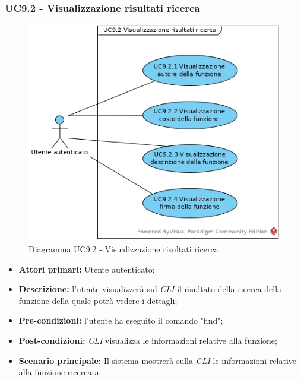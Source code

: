 \subsubsection{UC9.2 - Visualizzazione risultati ricerca}
\begin{figure}[h]
	\centering
	\includegraphics[width=0.7\linewidth]{res/img/UC9.2.jpg}
	\caption{Diagramma UC9.2 - Visualizzazione risultati ricerca}
\end{figure}
\begin{itemize}
	\item \textbf{Attori primari:} Utente autenticato;
	\item \textbf{Descrizione:} l'utente visualizzerà sul \textit{CLI\glo} il risultato della ricerca della funzione della quale potrà vedere i dettagli;
	\item \textbf{Pre-condizioni:} l'utente ha eseguito il comando "find";
	\item \textbf{Post-condizioni:} \textit{CLI\glo} visualizza le informazioni relative alla funzione;
	\item \textbf{Scenario principale:} Il sistema mostrerà sulla \textit{CLI\glo} le informazioni relative alla funzione ricercata.
\end{itemize}

